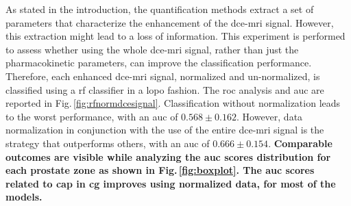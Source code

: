 As stated in the introduction, the quantification methods extract a
set of parameters that characterize the enhancement of the \ac{dce}-\ac{mri} signal.
However, this extraction might lead to a loss of information.
This experiment is performed to assess whether using the whole
\ac{dce}-\ac{mri} signal, rather than just the pharmacokinetic parameters, can improve the classification performance.
Therefore, each enhanced \ac{dce}-\ac{mri} signal, normalized and un-normalized, is classified using a \ac{rf} classifier in a \ac{lopo} fashion.
The \ac{roc} analysis and \ac{auc} are reported in Fig.\,\ref{fig:rfnormdcesignal}.
Classification without normalization leads to the worst performance,
with an \ac{auc} of $0.568 \pm 0.162$.
However, data normalization in conjunction with the use of the entire
\ac{dce}-\ac{mri} signal is the strategy that outperforms others,
with an \ac{auc} of $0.666 \pm 0.154$.
\textbf{Comparable outcomes are visible while analyzing the \ac{auc}
scores distribution for each prostate zone as shown in
Fig.\,\ref{fig:boxplot}. The \ac{auc} scores
related to \ac{cap} in \ac{cg} improves using normalized data, for
most of the models.}

